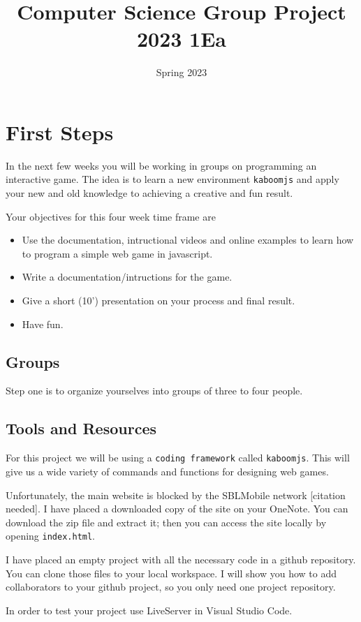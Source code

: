 \documentclass[11pt,a4paper]{report}
\title{Computer Science Group Project 2023 1Ea}
\date{Spring 2023}
\begin{document}
\maketitle

\newpage
\section{First Steps}
In the next few weeks you will be working in groups on programming an interactive game. The idea is to learn a new environment \verb|kaboomjs| and apply your new and old knowledge to achieving a creative and fun result.

Your objectives for this four week time frame are
\begin{itemize}
\item Use the documentation,  intructional videos and online examples to learn how to program a simple web game in javascript.
\item Write a documentation/intructions for the game.
\item Give a short (10') presentation on your process and final result.
\item Have fun.
\end{itemize}

\subsection{Groups}
Step one is to organize yourselves into groups of three to four people. 
\subsection{Tools and Resources}
For this project we will be using a \verb|coding framework| called \verb|kaboomjs|. This will give us a wide variety of commands and functions for designing web games.

Unfortunately, the main website is blocked by the SBLMobile network {\color{blue} [citation needed]}. I have placed a downloaded copy of the site on your OneNote. You can download the zip file and extract it; then you can access the site locally by opening \verb|index.html|.

I have placed an empty project with all the necessary code in a github repository. You can clone those files to your local workspace. I will show you how to add collaborators to your github project, so you only need one project repository.

In order to test your project use LiveServer in Visual Studio Code.
\end{document}

